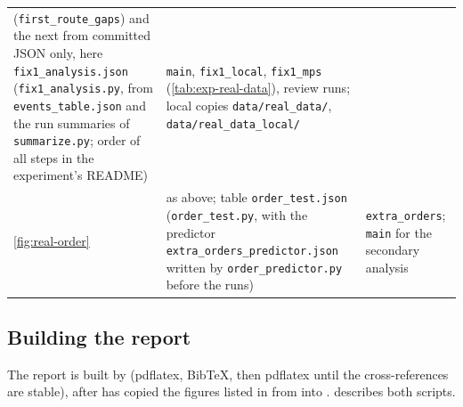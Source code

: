 \begin{xltabular}{\textwidth}{@{}l>{\raggedright\arraybackslash}p{6.4cm}>{\raggedright\arraybackslash}X@{}}
      (\texttt{first\_route\_gaps}) and the next from committed JSON only, here \texttt{fix1\_analysis.json}
      (\texttt{fix1\_analysis.py}, from \texttt{events\_table.json} and the run summaries of
      \texttt{summarize.py}; order of all steps in the experiment's README)
      & \texttt{main}, \texttt{fix1\_local}, \texttt{fix1\_mps} (\cref{tab:exp-real-data}), review runs;
      local copies \texttt{data/real\_data/}, \texttt{data/real\_data\_local/} \\
    \ref{fig:real-order} & as above; table \texttt{order\_test.json} (\texttt{order\_test.py}, with the
      predictor \texttt{extra\_orders\_predictor.json} written by \texttt{order\_predictor.py} before the
      runs)
      & \texttt{extra\_orders}; \texttt{main} for the secondary analysis \\
\end{xltabular}
\endgroup

\subsection{Building the report}\label{app:repro-build}
The report is built by  (pdflatex, BibTeX, then pdflatex until the
cross-references are stable), after  has copied the figures listed
in  from  into .
 describes both scripts.
